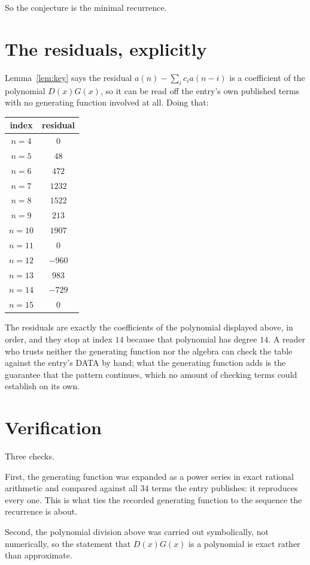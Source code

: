 \documentclass[11pt,a4paper]{article}
\theoremstyle{plain}
\theoremstyle{definition}
\begin{document}
So the conjecture is the minimal recurrence.

\section{The residuals, explicitly}

Lemma~\ref{lem:key} says the residual $a(n)-\sum_ic_ia(n-i)$ is a coefficient of the
polynomial $D(x)G(x)$, so it can be read off the entry's own published terms with no
generating function involved at all. Doing that:
\begin{center}
\begin{tabular}{cc}
index & residual \\ \hline
$n=4$ & $0$ \\
$n=5$ & $48$ \\
$n=6$ & $472$ \\
$n=7$ & $1232$ \\
$n=8$ & $1522$ \\
$n=9$ & $213$ \\
$n=10$ & $1907$ \\
$n=11$ & $0$ \\
$n=12$ & $-960$ \\
$n=13$ & $983$ \\
$n=14$ & $-729$ \\
$n=15$ & $0$
\end{tabular}
\end{center}
The residuals are exactly the coefficients of the polynomial displayed above, in order, and
they stop at index $14$ because that polynomial has degree $14$. A reader who trusts
neither the generating function nor the algebra can check the table against the entry's DATA
by hand; what the generating function adds is the guarantee that the pattern continues, which
no amount of checking terms could establish on its own.

\section{Verification}

Three checks.

First, the generating function was expanded as a power series in exact rational arithmetic and
compared against all $34$ terms the entry publishes: it reproduces every one. This is
what ties the recorded generating function to the sequence the recurrence is about.

Second, the polynomial division above was carried out symbolically, not numerically, so the
statement that $D(x)G(x)$ is a polynomial is exact rather than approximate.
\end{document}

